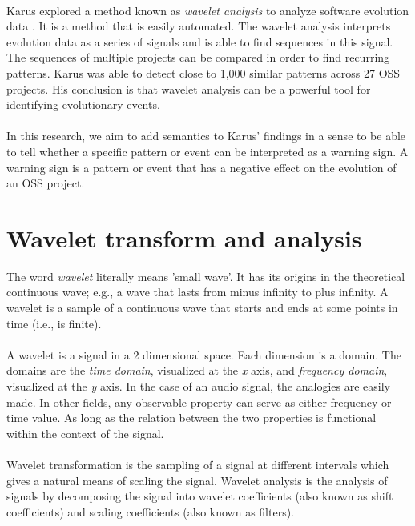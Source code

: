 \paragraph{}
Karus explored a method known as \emph{wavelet analysis }\rm to analyze software
evolution data \cite{karus2013}. It is a method that is easily automated. The
wavelet analysis interprets evolution data as a series of signals and is able
to find sequences in this signal. The sequences of multiple projects can be
compared in order to find recurring patterns. Karus was able to detect close to
1,000 similar patterns across 27 OSS projects. His conclusion is that wavelet
analysis can be a powerful tool for identifying evolutionary events.

\paragraph{}
In this research, we aim to add semantics to Karus' findings in a sense to be
able to tell whether a specific pattern or event can be interpreted as a
warning sign. A warning sign is a pattern or event that has a negative effect
on the evolution of an OSS project.

\section{Wavelet transform and analysis}
The word \emph{wavelet }\rm literally means 'small wave'. It has its origins in
the theoretical continuous wave; e.g., a wave that lasts from minus infinity
to plus infinity. A wavelet is a sample of a continuous wave that starts and
ends at some points in time (i.e., is finite).

\paragraph{}
A wavelet is a signal in a 2 dimensional space. Each dimension is a domain. The
domains are the \emph{time domain}\rm, visualized at the \emph{x }\rm axis,
and \emph{frequency domain}\rm, visualized at the \emph{y }\rm axis.
In the case of an audio signal, the analogies are easily made. In other fields, any
observable property can serve as either frequency or time value. As long as the
relation between the two properties is functional within the context of the
signal.

\paragraph{}
Wavelet transformation is the sampling of a signal at different intervals which
gives a natural means of scaling the signal. Wavelet analysis is the analysis of
signals by decomposing the signal into wavelet coefficients (also known as shift
coefficients) and scaling coefficients (also known as filters).

